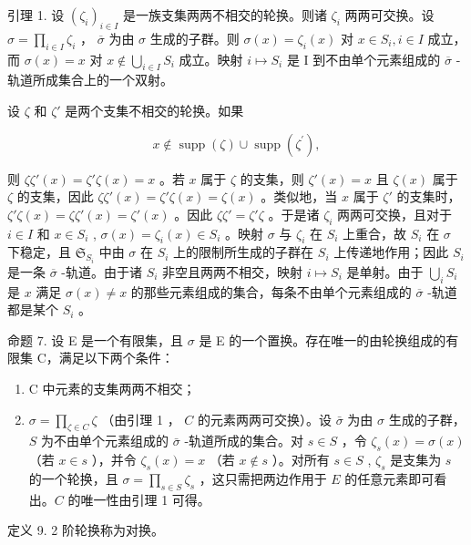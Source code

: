 引理 1. 设 \((\zeta_{i})_{i\in I}\) 是一族支集两两不相交的轮换。则诸 \(\zeta_{i}\) 两两可交换。设 \(\sigma = \prod_{i\in I}\zeta_{i}\) ， \(\overline{\sigma}\) 为由 \(\sigma\) 生成的子群。则 \(\sigma(x) = \zeta_{i}(x)\) 对 \(x\in S_{i}, i\in I\) 成立，而 \(\sigma(x) = x\) 对 \(x\notin \bigcup_{i\in I}S_{i}\) 成立。映射 \(i\mapsto S_i\) 是 I 到不由单个元素组成的 \(\overline{\sigma}\) -轨道所成集合上的一个双射。

设 \(\zeta\) 和 \(\zeta'\) 是两个支集不相交的轮换。如果

\[
x \notin \operatorname{supp} (\zeta) \cup \operatorname{supp} \left(\zeta^ {\prime}\right),
\]

则 \(\zeta\zeta'(x) = \zeta'\zeta(x) = x\) 。若 \(x\) 属于 \(\zeta\) 的支集，则 \(\zeta'(x) = x\) 且 \(\zeta(x)\) 属于 \(\zeta\) 的支集，因此 \(\zeta\zeta'(x) = \zeta'\zeta(x) = \zeta(x)\) 。类似地，当 \(x\) 属于 \(\zeta'\) 的支集时， \(\zeta'\zeta(x) = \zeta\zeta'(x) = \zeta'(x)\) 。因此 \(\zeta\zeta' = \zeta'\zeta\) 。于是诸 \(\zeta_i\) 两两可交换，且对于 \(i \in I\) 和 \(x \in S_i\) , \(\sigma(x) = \zeta_i(x) \in S_i\) 。映射 \(\sigma\) 与 \(\zeta_i\) 在 \(S_i\) 上重合，故 \(S_i\) 在 \(\sigma\) 下稳定，且 \(\mathfrak{S}_{S_i}\) 中由 \(\sigma\) 在 \(S_i\) 上的限制所生成的子群在 \(S_i\) 上传递地作用；因此 \(S_i\) 是一条 \(\overline{\sigma}\) -轨道。由于诸 \(S_i\) 非空且两两不相交，映射 \(i \mapsto S_i\) 是单射。由于 \(\bigcup_{i} S_i\) 是 \(x\) 满足 \(\sigma(x) \neq x\) 的那些元素组成的集合，每条不由单个元素组成的 \(\overline{\sigma}\) -轨道都是某个 \(S_i\) 。

命题 7. 设 E 是一个有限集，且 \(\sigma\) 是 E 的一个置换。存在唯一的由轮换组成的有限集 C，满足以下两个条件：

\begin{enumerate}
\def\labelenumi{(\alph{enumi})}
\item
  C 中元素的支集两两不相交；
\item
  \(\sigma = \prod_{\zeta \in C} \zeta\) （由引理 1 ， \(C\) 的元素两两可交换）。设 \(\bar{\sigma}\) 为由 \(\sigma\) 生成的子群， \(S\) 为不由单个元素组成的 \(\bar{\sigma}\) -轨道所成的集合。对 \(s \in S\) ，令 \(\zeta_s(x) = \sigma(x)\) （若 \(x \in s\) ），并令 \(\zeta_s(x) = x\) （若 \(x \notin s\) ）。对所有 \(s \in S\) , \(\zeta_s\) 是支集为 \(s\) 的一个轮换，且 \(\sigma = \prod_{s \in S} \zeta_s\) ，这只需把两边作用于 \(E\) 的任意元素即可看出。\(C\) 的唯一性由引理 1 可得。
\end{enumerate}

定义 9. 2 阶轮换称为对换。

